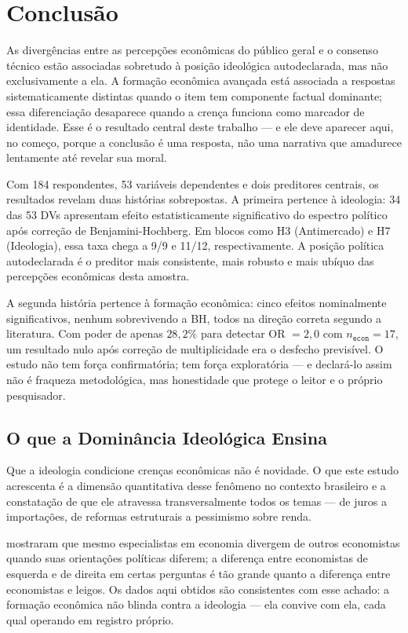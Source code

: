 \chapter{Conclusão}

As divergências entre as percepções econômicas do público geral e o consenso técnico estão associadas sobretudo à posição ideológica autodeclarada, mas não exclusivamente a ela. A formação econômica avançada está associada a respostas sistematicamente distintas quando o item tem componente factual dominante; essa diferenciação desaparece quando a crença funciona como marcador de identidade. Esse é o resultado central deste trabalho — e ele deve aparecer aqui, no começo, porque a conclusão é uma resposta, não uma narrativa que amadurece lentamente até revelar sua moral.

Com 184 respondentes, 53 variáveis dependentes e dois preditores centrais, os resultados revelam duas histórias sobrepostas. A primeira pertence à ideologia: 34 das 53 DVs apresentam efeito estatisticamente significativo do espectro político após correção de Benjamini-Hochberg. Em blocos como H3 (Antimercado) e H7 (Ideologia), essa taxa chega a 9/9 e 11/12, respectivamente. A posição política autodeclarada é o preditor mais consistente, mais robusto e mais ubíquo das percepções econômicas desta amostra.

A segunda história pertence à formação econômica: cinco efeitos nominalmente significativos, nenhum sobrevivendo a BH, todos na direção correta segundo a literatura. Com poder de apenas $28{,}2\%$ para detectar OR $= 2{,}0$ com $n_{\texttt{econ}} = 17$, um resultado nulo após correção de multiplicidade era o desfecho previsível. O estudo não tem força confirmatória; tem força exploratória — e declará-lo assim não é fraqueza metodológica, mas honestidade que protege o leitor e o próprio pesquisador.

\section{O que a Dominância Ideológica Ensina}
\label{sec:dominancia-ideologica-licao}

Que a ideologia condicione crenças econômicas não é novidade. O que este estudo acrescenta é a dimensão quantitativa desse fenômeno no contexto brasileiro e a constatação de que ele atravessa transversalmente todos os temas — de juros a importações, de reformas estruturais a pessimismo sobre renda.

 mostraram que mesmo especialistas em economia divergem de outros economistas quando suas orientações políticas diferem; a diferença entre economistas de esquerda e de direita em certas perguntas é tão grande quanto a diferença entre economistas e leigos. Os dados aqui obtidos são consistentes com esse achado: a formação econômica não blinda contra a ideologia — ela convive com ela, cada qual operando em registro próprio.

